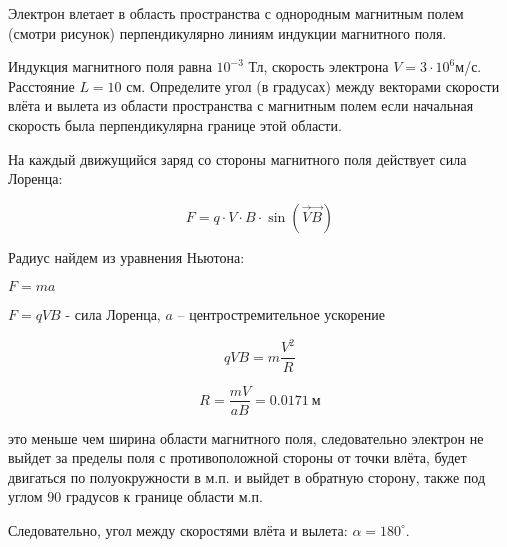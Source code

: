 
Электрон влетает в область пространства с однородным магнитным полем (смотри рисунок) перпендикулярно линиям индукции магнитного поля.


Индукция магнитного поля равна $ 10^{-3} $ Тл, скорость электрона $ V=3\cdot10^6 $м/с. 
Расстояние $ L =10 $ см. Определите угол (в градусах) между векторами скорости влёта и вылета из 
области пространства с магнитным полем если начальная скорость была перпендикулярна границе этой области.


\solutionSection

На каждый движущийся заряд со стороны магнитного поля действует сила Лоренца:

$$F = q \cdot V \cdot B \cdot \sin (\overrightarrow{V} \overrightarrow{B})$$

Радиус найдем из уравнения Ньютона:

$F = ma$

$F = qVB$ - сила Лоренца, $a$ – центростремительное ускорение
 
$$qVB = m \frac{V^2}{R}$$

$$R = \frac{mV}{aB} = 0.0171 \: \text{м}$$

\noindent это меньше чем ширина области магнитного поля, следовательно электрон не выйдет за пределы поля с противоположной 
стороны от точки влёта, будет двигаться по полуокружности в м.п. и выйдет в обратную сторону, также под углом $90$ градусов к границе 
области м.п.

Следовательно, угол между скоростями влёта и вылета: $\alpha = 180^\circ$.

